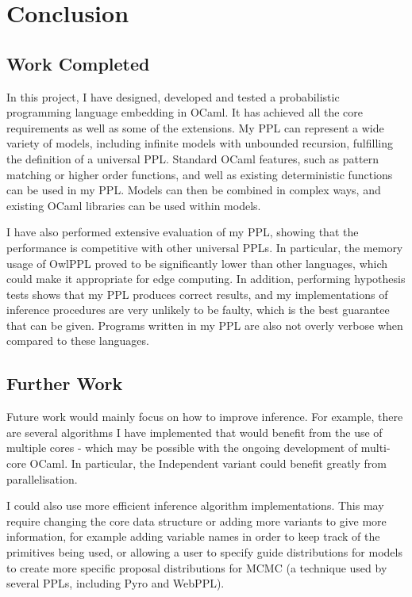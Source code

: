 \vspace{-10mm}
\chapter{Conclusion}
\vspace{-7mm}
\section{Work Completed}
In this project, I have designed, developed and tested a probabilistic programming language embedding in OCaml. It has achieved all the core requirements as well as some of the extensions. My PPL can represent a wide variety of models, including infinite models with unbounded recursion, fulfilling the definition of a universal PPL. Standard OCaml features, such as pattern matching or higher order functions, and well as existing deterministic functions can be used in my PPL. Models can then be combined in complex ways, and existing OCaml libraries can be used within models.

I have also performed extensive evaluation of my PPL, showing that the performance is competitive with other universal PPLs. In particular, the memory usage of OwlPPL proved to be significantly lower than other languages, which could make it appropriate for edge computing. In addition, performing hypothesis tests shows that my PPL produces correct results, and my implementations of inference procedures are very unlikely to be faulty, which is the best guarantee that can be given. Programs written in my PPL are also not overly verbose when compared to these languages.
\vspace{-3mm}

\section{Further Work}

Future work would mainly focus on how to improve inference. For example, there are several algorithms I have implemented that would benefit from the use of multiple cores - which may be possible with the ongoing development of multi-core OCaml. In particular, the Independent variant could benefit greatly from parallelisation. 

I could also use more efficient inference algorithm implementations. This may require changing the core data structure or adding more variants to give more information, for example adding variable names in order to keep track of the primitives being used, or allowing a user to specify guide distributions for models to create more specific proposal distributions for MCMC (a technique used by several PPLs, including Pyro and WebPPL).

